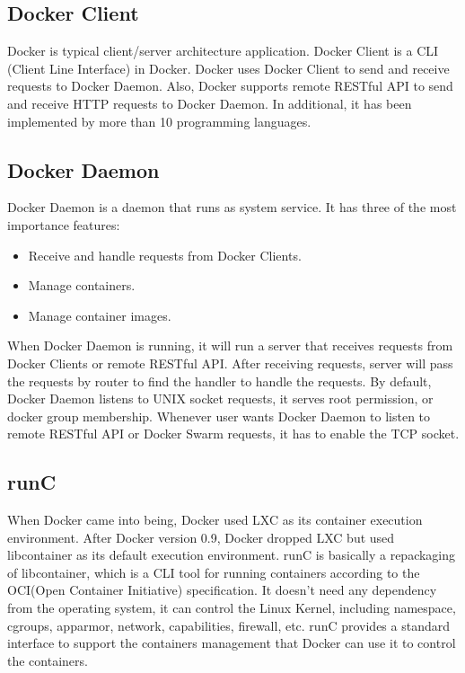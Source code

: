 \subsection{Docker Client}
Docker is typical client/server architecture application.
Docker Client is a \linebreak CLI (Client Line Interface) in Docker.
Docker uses Docker Client to send and receive requests to Docker Daemon. Also, Docker supports remote RESTful API \cite{christensen2009using} to send and receive HTTP requests to Docker Daemon.
In additional, it has been implemented by more than 10 programming languages.

\subsection{Docker Daemon}
Docker Daemon is a daemon that runs as system service. It has three of the most importance features: 
\begin{itemize}
    \item Receive and handle requests from Docker Clients.
    \item Manage containers.
    \item Manage container images.
\end{itemize}
When Docker Daemon is running, it will run a server that receives requests from Docker Clients or remote RESTful API. After receiving requests, server will pass the requests by router to find the handler to handle the requests. By default, Docker Daemon listens to UNIX socket requests, it serves root permission, or docker group membership. Whenever user wants Docker Daemon to listen to remote RESTful API or Docker Swarm requests, it has to enable the TCP socket.

\subsection{runC}
When Docker came into being, Docker used LXC as its container execution environment. After Docker version 0.9, Docker dropped LXC but used libcontainer as its default execution environment.
runC \cite{runc} is basically a repackaging of libcontainer, which is a CLI tool for running containers according to the OCI(Open Container Initiative) \cite{oci} specification. It doesn't need any dependency from the operating system, it can control the Linux Kernel, including namespace, cgroups, apparmor, network, capabilities, firewall, etc.
runC provides a standard interface to support the containers management that Docker can use it to control the containers.

